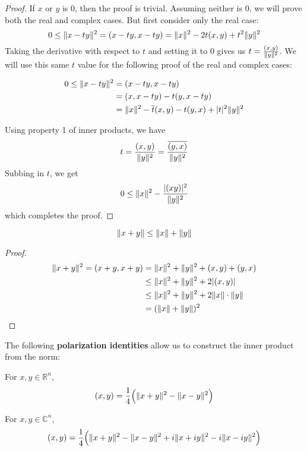 \begin{proof}
If $x$ or $y$ is 0, then the proof is trivial. Assuming neither is 0, we will prove both the real and complex cases. But first consider only the real case: 
$$0 \leq \lVert x - ty\rVert^{2} = (x - ty, x - ty) = \lVert x\rVert^{2} - 2t(x, y) + t^{2} \lVert y\rVert^{2} $$
Taking the derivative with respect to $t$ and setting it to 0 gives us $t = \frac{(x, y)}{\lVert y\rVert^{2}}$. We will use this same $t$ value for the following proof of the real and complex cases:

$$
\begin{aligned}
0 \leq \lVert x-ty\rVert^{2} &= (x - ty, x - ty) \\ 
&= (x, x - ty) -t(y, x - ty) \\
&= \lVert x\rVert^{2} - \overline{t} (x, y) -t (y, x) + \lvert t\rvert^{2} \lVert y\rVert^{2}
\end{aligned}
$$

Using property 1 of inner products, we have 
$$t = \frac{(x, y)}{\lVert y\rVert^{2}} = \frac{\overline{(y, x)}}{\lVert y\rVert^{2}}$$
Subbing in $t$, we get 
$$ 0 \leq \lVert x\rVert^{2} - \frac{\lvert(x y)\rvert^{2}}{\lVert y\rVert^{2}}$$
which completes the proof. 
\end{proof}

\begin{theorem}
$$\lVert x + y\rVert \leq \lVert x\rVert + \lVert y\rVert$$
\end{theorem}

\begin{proof}
$$
\begin{aligned}
\lVert x + y\rVert^{2} = (x + y, x + y) &= \lVert x\rVert^{2} + \lVert y\rVert^{2} + (x, y) + (y, x) \\
&\leq \lVert x\rVert^{2} + \lVert y\rVert^{2} + 2 \lvert(x, y)\rvert \\
&\leq \lVert x\rVert^{2} + \lVert y\rVert^{2} + 2 \lVert x\rVert \cdot \lVert y\rVert \\
&= (\lVert x\rVert + \lVert y\rVert)^{2}
\end{aligned}
$$
\end{proof}

\begin{theorem}
The following \textbf{polarization identities} allow us to construct the inner product from the norm: 

For $x, y \in \mathbb{R}^{n}$, 
$$(x, y) = \frac{1}{4} \Big( \lVert x + y\rVert^{2} - \lVert x - y\rVert^{2} \Big) $$

For $x, y \in \mathbb{C}^{n}$, 
$$(x, y) = \frac{1}{4} \Big( \lVert x + y\rVert^{2} - \lVert x - y\rVert^{2} +i \lVert x + iy\rVert^{2} -i \lVert x - iy\rVert^{2} \Big)$$
\end{theorem}

